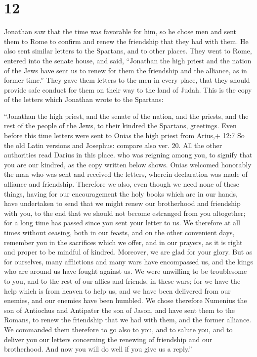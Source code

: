 \hypertarget{section-11}{%
\section{12}\label{section-11}}

 Jonathan saw that the time was favorable for him, so he
chose men and sent them to Rome to confirm and renew the friendship that
they had with them.  He also sent similar letters to the
Spartans, and to other places.  They went to Rome, entered
into the senate house, and said, ``Jonathan the high priest and the
nation of the Jews have sent us to renew for them the friendship and the
alliance, as in former time.''  They gave them letters to
the men in every place, that they should provide safe conduct for them
on their way to the land of Judah.  This is the copy of the
letters which Jonathan wrote to the Spartans:

 ``Jonathan the high priest, and the senate of the nation,
and the priests, and the rest of the people of the Jews, to their
kindred the Spartans, greetings.  Even before this time
letters were sent to Onias the high priest from Arius,+ 12:7 So the old
Latin versions and Josephus: compare also ver. 20. All the other
authorities read Darius in this place. who was reigning among you, to
signify that you are our kindred, as the copy written below shows.
 Onias welcomed honorably the man who was sent and received
the letters, wherein declaration was made of alliance and friendship.
 Therefore we also, even though we need none of these
things, having for our encouragement the holy books which are in our
hands,  have undertaken to send that we might renew our
brotherhood and friendship with you, to the end that we should not
become estranged from you altogether; for a long time has passed since
you sent your letter to us.  We therefore at all times
without ceasing, both in our feasts, and on the other convenient days,
remember you in the sacrifices which we offer, and in our prayers, as it
is right and proper to be mindful of kindred.  Moreover, we
are glad for your glory.  But as for ourselves, many
afflictions and many wars have encompassed us, and the kings who are
around us have fought against us.  We were unwilling to be
troublesome to you, and to the rest of our allies and friends, in these
wars;  for we have the help which is from heaven to help
us, and we have been delivered from our enemies, and our enemies have
been humbled.  We chose therefore Numenius the son of
Antiochus and Antipater the son of Jason, and have sent them to the
Romans, to renew the friendship that we had with them, and the former
alliance.  We commanded them therefore to go also to you,
and to salute you, and to deliver you our letters concerning the
renewing of friendship and our brotherhood.  And now you
will do well if you give us a reply.''

